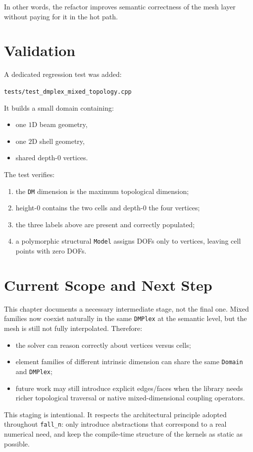 In other words, the refactor improves semantic correctness of the mesh layer
without paying for it in the hot path.

\section{Validation}

A dedicated regression test was added:
\begin{center}
  \texttt{tests/test\_dmplex\_mixed\_topology.cpp}
\end{center}
It builds a small domain containing:
\begin{itemize}
  \item one $1$D beam geometry,
  \item one $2$D shell geometry,
  \item shared depth-$0$ vertices.
\end{itemize}

The test verifies:
\begin{enumerate}
  \item the \texttt{DM} dimension is the maximum topological dimension;
  \item height-$0$ contains the two cells and depth-$0$ the four vertices;
  \item the three labels above are present and correctly populated;
  \item a polymorphic structural \texttt{Model} assigns DOFs only to vertices,
        leaving cell points with zero DOFs.
\end{enumerate}

\section{Current Scope and Next Step}

This chapter documents a necessary intermediate stage, not the final one.
Mixed families now coexist naturally in the same \texttt{DMPlex} at the
semantic level, but the mesh is still not fully interpolated. Therefore:
\begin{itemize}
  \item the solver can reason correctly about vertices versus cells;
  \item element families of different intrinsic dimension can share the same
        \texttt{Domain} and \texttt{DMPlex};
  \item future work may still introduce explicit edges/faces when the library
        needs richer topological traversal or native mixed-dimensional coupling
        operators.
\end{itemize}

This staging is intentional. It respects the architectural principle adopted
throughout \texttt{fall\_n}: only introduce abstractions that correspond to a
real numerical need, and keep the compile-time structure of the kernels as
static as possible.
